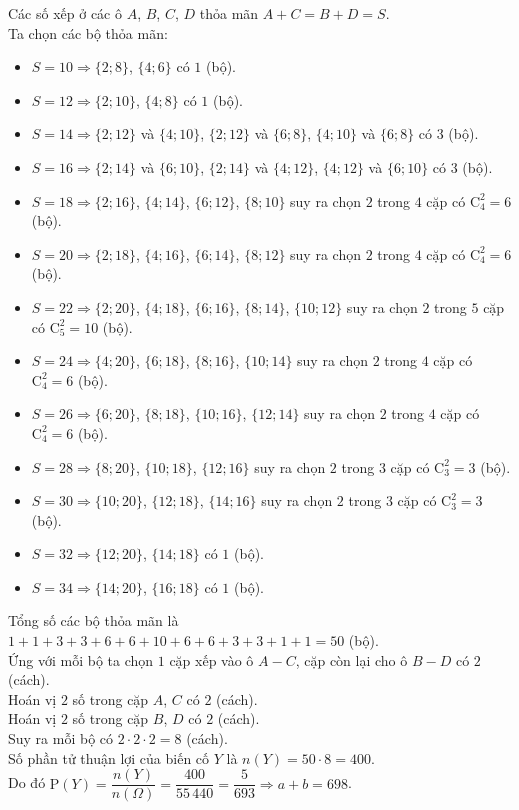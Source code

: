 \begin{ex}
{		Các số xếp ở các ô $A$, $B$, $C$, $D$ thỏa mãn $A+C=B+D=S$.\\ Ta chọn các bộ thỏa mãn:
		\begin{itemize}
			\item $S=10 \Rightarrow \{2;8\}$, $\{4;6\}$ có $1$ (bộ).
			\item $S=12 \Rightarrow \{2;10\}$, $\{4;8\}$ có $1$ (bộ).
			\item $S=14 \Rightarrow \{2;12\}$ và $\{4;10\}$, $\{2;12\}$ và $\{6;8\}$, $\{4;10\}$ và $\{6;8\}$ có $3$ (bộ).
			\item $S=16 \Rightarrow \{2;14\}$ và $\{6;10\}$, $\{2;14\}$ và $\{4;12\}$, $\{4;12\}$ và $\{6;10\}$ có $3$ (bộ).
			\item $S=18 \Rightarrow \{2;16\}$, $\{4;14\}$, $\{6;12\}$, $\{8;10\}$ suy ra chọn $2$ trong $4$ cặp có $\mathrm{C}_4^2=6$ (bộ).
			\item $S=20 \Rightarrow \{2;18\}$, $\{4;16\}$, $\{6;14\}$, $\{8;12\}$ suy ra chọn $2$ trong $4$ cặp có $\mathrm{C}_4^2=6$ (bộ).
			\item $S=22 \Rightarrow \{2;20\}$, $\{4;18\}$, $\{6;16\}$, $\{8;14\}$, $\{10;12\}$ suy ra chọn $2$ trong $5$ cặp có $\mathrm{C}_5^2=10$ (bộ).
			\item $S=24 \Rightarrow \{4;20\}$, $\{6;18\}$, $\{8;16\}$, $\{10;14\}$ suy ra chọn $2$ trong $4$ cặp có $\mathrm{C}_4^2=6$ (bộ).
			\item $S=26 \Rightarrow \{6;20\}$, $\{8;18\}$, $\{10;16\}$, $\{12;14\}$ suy ra chọn $2$ trong $4$ cặp có $\mathrm{C}_4^2=6$ (bộ).
			\item $S=28 \Rightarrow \{8;20\}$, $\{10;18\}$, $\{12;16\}$ suy ra chọn $2$ trong $3$ cặp có $\mathrm{C}_3^2=3$ (bộ).
			\item $S=30 \Rightarrow \{10;20\}$, $\{12;18\}$, $\{14;16\}$ suy ra chọn $2$ trong $3$ cặp có $\mathrm{C}_3^2=3$ (bộ).
			\item $S=32 \Rightarrow \{12;20\}$, $\{14;18\}$ có $1$ (bộ).
			\item $S=34 \Rightarrow \{14;20\}$, $\{16;18\}$ có $1$ (bộ).
		\end{itemize}
		Tổng số các bộ thỏa mãn là $1+1+3+3+6+6+10+6+6+3+3+1+1=50$ (bộ).\\
		Ứng với mỗi bộ ta chọn $1$ cặp xếp vào ô $A-C$, cặp còn lại cho ô $B-D$ có $2$ (cách).\\
		Hoán vị $2$ số trong cặp $A$, $C$ có $2$ (cách).\\
		Hoán vị $2$ số trong cặp $B$, $D$ có $2$ (cách).\\
		Suy ra mỗi bộ có $2 \cdot 2 \cdot 2=8$ (cách).\\
		Số phần tử thuận lợi của biến cố $Y$ là $n(Y)=50 \cdot 8=400$.\\
		Do đó $\mathrm{P}(Y)=\dfrac{n(Y)}{n(\Omega)}=\dfrac{400}{55\,440}=\dfrac{5}{693} \Rightarrow a+b=698$.
	}
\end{ex}

